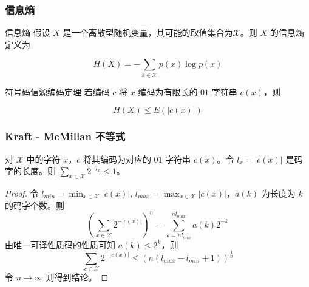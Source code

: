 \documentclass{beamer}
\begin{document}
\begin{frame}
    \frametitle{信息熵}

    \begin{block}{信息熵}
        假设 $X$ 是一个离散型随机变量，其可能的取值集合为$\mathcal{X}$。则 $X$ 的信息熵定义为

        \[H(X) = -\sum_{x\in \mathcal{X}}p(x)\log p(x)\]
    \end{block}

    \begin{block}{符号码信源编码定理}
        若编码 $c$ 将 $x$ 编码为有限长的 $01$ 字符串 $c(x)$，则

        \[H(X) \leq E(\lvert c(x)\rvert)\]
    \end{block}




\end{frame}

\begin{frame}
    \frametitle{Kraft - McMillan 不等式}

    对 $\mathcal{X}$ 中的字符 $x$，$c$ 将其编码为对应的 $01$ 字符串 $c(x)$。令 $l_x = \lvert c(x)\rvert$ 是码字的长度。则 $\sum_{x\in\mathcal{X}}2^{-l_x}\leq 1$。

    \begin{proof}
        令 $l_{min} = \min_{x\in\mathcal{X}}\lvert c(x)\rvert$, $l_{max} = \max_{x\in\mathcal{X}}\lvert c(x)\rvert$，$a(k)$ 为长度为 $k$ 的码字个数。则
        \[\left(\sum_{x\in\mathcal{X}}2^{-\lvert c(x)\rvert}\right)^n = \sum_{k = nl_{min}}^{nl_{max}} a(k)2^{-k}\]
        由唯一可译性质码的性质可知 $a(k)\leq 2^k$，则
        \[\sum_{x\in\mathcal{X}}2^{-\lvert c(x)\rvert} \leq (n(l_{max} - l_{min} + 1))^{\frac{1}{n}}\]
        令 $n\to\infty$ 则得到结论。
    \end{proof}

\end{frame}
\end{document}
